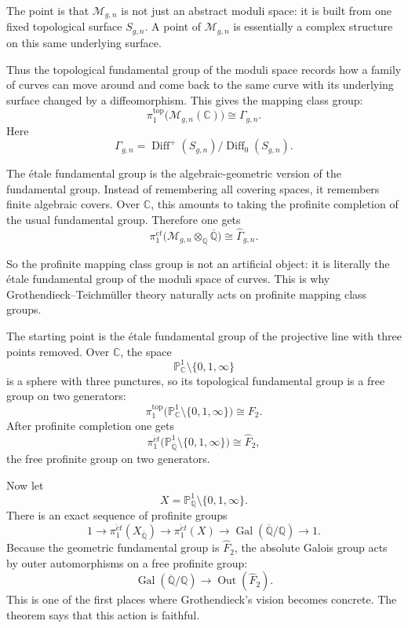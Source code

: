 \medskip\noindent
The point is that $\mathcal M_{g,n}$ is
not just an abstract moduli space: it is
built from one fixed topological surface
$S_{g,n}$. A point of $\mathcal M_{g,n}$
is essentially a complex structure on this
same underlying surface.

\medskip\noindent
Thus the topological fundamental group of
the moduli space records how a family of
curves can move around and come back to the
same curve with its underlying surface
changed by a diffeomorphism. This gives the
mapping class group:
$$
\pi_1^{\mathrm{top}}
\bigl(\mathcal M_{g,n}(\mathbb C)\bigr)
\cong
\Gamma_{g,n}.
$$
Here
$$
\Gamma_{g,n}
=
\operatorname{Diff}^+(S_{g,n})/
\operatorname{Diff}_0(S_{g,n}).
$$

\medskip\noindent
The \'etale fundamental group is the
algebraic-geometric version of the
fundamental group. Instead of remembering
all covering spaces, it remembers finite
algebraic covers. Over $\mathbb C$, this
amounts to taking the profinite completion
of the usual fundamental group. Therefore
one gets
$$
\pi_1^{\acute{e}t}
\bigl(\mathcal M_{g,n}
\otimes_{\mathbb Q}\overline{\mathbb Q}\bigr)
\cong
\widehat{\Gamma}_{g,n}.
$$

\medskip\noindent
So the profinite mapping class group is not
an artificial object: it is literally the
\'etale fundamental group of the moduli
space of curves. This is why
Grothendieck--Teichm\"uller theory naturally
acts on profinite mapping class groups.

\medskip\noindent
The starting point is the \'etale
fundamental group of the projective line with
three points removed. Over $\mathbb{C}$, the
space
$$
\mathbb{P}^1_{\mathbb{C}} \setminus \{0,1,\infty\}
$$
is a sphere with three punctures, so its
topological fundamental group is a free group
on two generators:
$$
\pi_1^{\mathrm{top}}
\bigl(\mathbb{P}^1_{\mathbb{C}} \setminus
\{0,1,\infty\}\bigr)
\cong F_2.
$$
After profinite completion one gets
$$
\pi_1^{\acute{e}t}
\bigl(\mathbb{P}^1_{\overline{\mathbb{Q}}} \setminus
\{0,1,\infty\}\bigr)
\cong \widehat{F}_2,
$$
the free profinite group on two generators.

\medskip\noindent
Now let
$$
X=\mathbb{P}^1_{\mathbb{Q}} \setminus
\{0,1,\infty\}.
$$
There is an exact sequence of profinite
groups
$$
1\to
\pi_1^{\acute{e}t}(X_{\overline{\mathbb{Q}}})
\to
\pi_1^{\acute{e}t}(X)
\to
\operatorname{Gal}(\overline{\mathbb{Q}}/\mathbb{Q})
\to 1.
$$
Because the geometric fundamental group is
\(\widehat{F}_2\), the absolute Galois group
acts by outer automorphisms on a free
profinite group:
$$
\operatorname{Gal}(\overline{\mathbb{Q}}/\mathbb{Q})
\longrightarrow
\operatorname{Out}(\widehat{F}_2).
$$
This is one of the first places where
Grothendieck's vision becomes concrete.
The theorem says that this action is
faithful.

